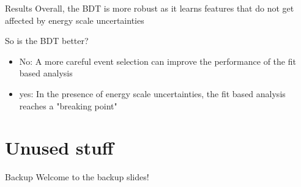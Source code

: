 \documentclass[bigger]{beamer}
\begin{document}
\begin{frame}[label={sec:org7fbeae6}]{Results}
Overall, the BDT is more robust as it learns features that do not get affected by energy scale uncertainties\newline

\alert{So is the BDT better?}
\begin{itemize}
\item No: A more careful event selection can improve the performance of the fit based analysis
\item yes: In the presence of energy scale uncertainties, the fit based analysis reaches a "breaking point"
\end{itemize}
\end{frame}

\section{Unused stuff}
\label{sec:orge0d2938}
\begin{frame}[label={sec:org1222400}]{Backup}
\alert{Welcome to the backup slides!}
\end{frame}
\end{document}
